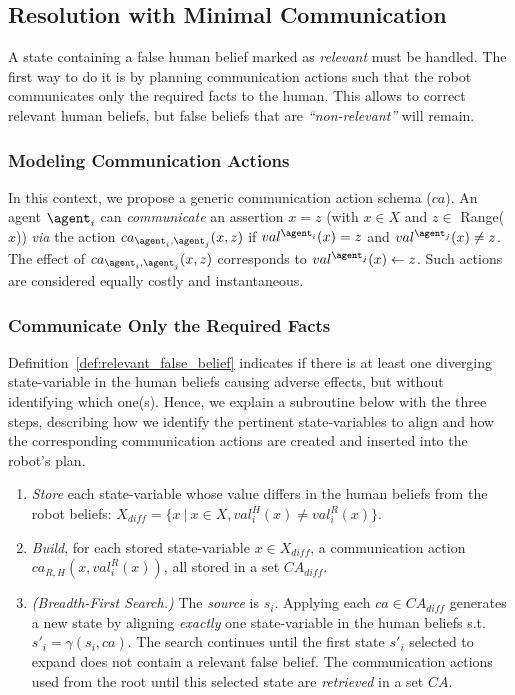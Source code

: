 {    \subsection{Resolution with Minimal Communication}

A state containing a false human belief marked as \textit{relevant} must be handled. 
The first way to do it is by planning communication actions such that the robot communicates only the required facts to the human. This allows to correct relevant human beliefs, but false beliefs that are \textit{``non-relevant''} will remain. 

\subsubsection{Modeling Communication Actions} 
In this context, we propose a generic communication action schema ($ca$). 
An agent $\agent_i$ can \textit{communicate} an assertion $x=z$ (with $x \in X$ and $z \in$ Range($x$)) \textit{via} the action $ca_{\agent_i, \agent_j}(x,z)$ if $val^{\agent_i}(x) = z$ and $val^{\agent_j}(x) \neq z$.
The effect of $ca_{\agent_i, \agent_j}(x,z)$ corresponds to $val^{\agent_j}(x) \leftarrow z$. Such actions are considered equally costly and instantaneous.

\subsubsection{Communicate Only the Required Facts}
Definition~\ref{def:relevant_false_belief} indicates if there is at least one diverging state-variable in the human beliefs causing adverse effects, but without identifying which one(s).
Hence, we explain a subroutine below with the three steps, describing how we identify the pertinent state-variables to align and how the corresponding communication actions are created and inserted into the robot's plan.

\begin{enumerate}
    \item 
    \textit{Store} each state-variable whose value differs in the human beliefs from the robot beliefs: $X_{diff} = \{ x ~|~ x\in X, val^H_i(x) \neq val^R_i(x) \}$.

    \item
    \textit{Build}, for each stored state-variable $x \in X_{diff}$, a communication action $ca_{R, H}(x,val^R_i(x))$, all stored in a set $\mathit{CA}_{diff}$.

    \item 
    \textit{(Breadth-First Search.)} 
    The \textit{source} is $s_i$. Applying each $ca \in \mathit{CA}_{diff}$ generates a new state by aligning \textit{exactly} one state-variable in the human beliefs s.t. $s'_i = \gamma(s_i, ca )$. 
    The search continues until the first state $s'_i$ selected to expand does not contain a relevant false belief. The communication actions used from the root until this selected state are \textit{retrieved} in a set $\mathit{CA}$.
\end{enumerate}

}

